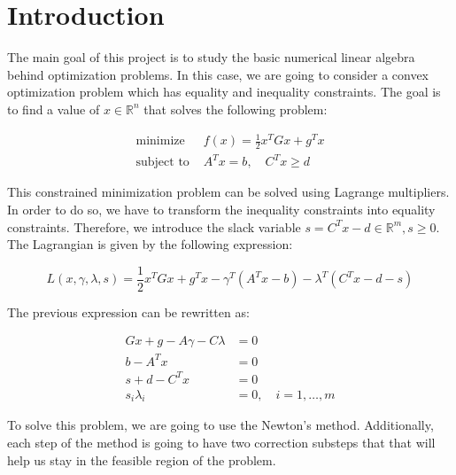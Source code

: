 \documentclass[11pt,a4paper]{article}
\begin{document}
\tableofcontents
\thispagestyle{empty}				%

\newpage

\setlength{\parskip}{1em}

\section{Introduction}

The main goal of this project is to study the basic numerical linear algebra
behind optimization problems. In this case, we are going to consider a convex
optimization problem which has equality and inequality constraints. The goal
is to find a value of $x \in \mathbb{R}^n$ that solves the following
problem:

\begin{equation}
  \label{eq:minimization-problem}
  \begin{aligned}
    \text{minimize } &f(x) = \frac{1}{2}x^TGx + g^Tx \\
    \text{subject to } &A^Tx = b, \quad C^Tx \geq d
  \end{aligned}
\end{equation}

This constrained minimization problem can be solved using Lagrange multipliers.
In order to do so, we have to transform the inequality constraints into equality
constraints. Therefore, we introduce the slack variable $s = C^Tx - d \in \mathbb{R}^m, s \geq 0$.
The Lagrangian is given by the following expression:

\begin{equation}
  \label{eq:lagrangian}
  L(x, \gamma, \lambda, s) = \frac{1}{2}x^TGx + g^Tx - \gamma^T(A^Tx - b) - \lambda^T(C^Tx - d - s)
\end{equation}

The previous expression can be rewritten as:

\begin{equation}
  \label{eq:system}
  \begin{aligned}
    Gx + g - A\gamma - C\lambda &= 0\\
    b - A^T x &= 0 \\
    s + d - C^Tx &= 0 \\
    s_i \lambda_i &= 0, \quad i = 1, \dots, m
  \end{aligned}  
\end{equation}

To solve this problem, we are going to use the Newton's method. Additionally, each step
of the method is going to have two correction substeps that that will help us stay in the feasible
region of the problem.
\end{document}
